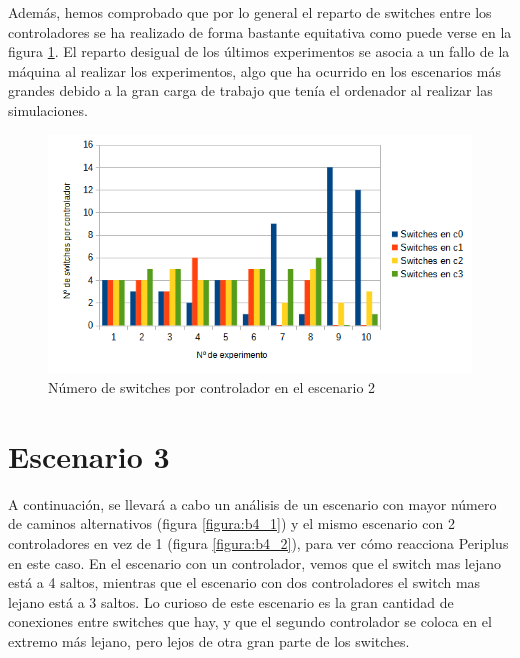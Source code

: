 \documentclass[a4paper, 12pt]{book}
\begin{document}
 	\vspace{10pt} 
 	
 	Además, hemos comprobado que por lo general el reparto de switches entre los controladores se ha realizado de forma bastante equitativa como puede verse en la figura \ref{figura:switchesporcontrollermesh}. El reparto desigual de los últimos experimentos se asocia a un fallo de la máquina al realizar los experimentos, algo que ha ocurrido en los escenarios más grandes debido a la gran carga de trabajo que tenía el ordenador al realizar las simulaciones. 
 	
 	
 	\begin{figure}[H]
 		\centering
 		\includegraphics[width=16cm, keepaspectratio]{img/switchesporcontrollermesh}
 		\caption{Número de switches por controlador en el escenario 2}
 		\label{figura:switchesporcontrollermesh}
 	\end{figure}
 	
 	
 	\clearpage
 	\section{Escenario 3}
 	 
 	A continuación, se llevará a cabo un análisis de un escenario con mayor número de caminos alternativos (figura \ref{figura:b4_1}) y el mismo escenario con 2 controladores en vez de 1 (figura \ref{figura:b4_2}), para ver cómo reacciona Periplus en este caso.
 	En el escenario con un controlador, vemos que el switch mas lejano está a 4 saltos, mientras que el escenario con dos controladores el switch mas lejano está a 3 saltos. Lo curioso de este escenario es la gran cantidad de conexiones entre switches que hay, y que el segundo controlador se coloca en el extremo más lejano, pero lejos de otra gran parte de los switches.
 	
\end{document}
